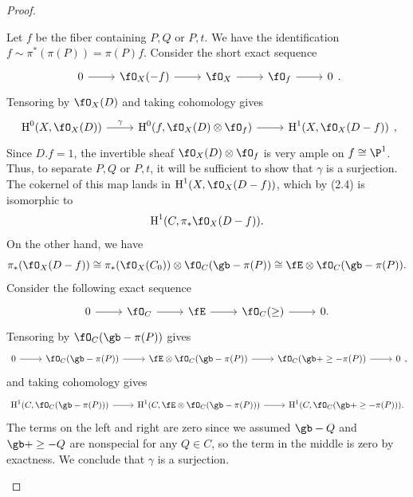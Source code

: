 \documentclass[a4paper]{article}
\begin{document}
\begin{enumerate} [label=\textbf{\arabic*.}, leftmargin=0em]
\begin{proof}
\begin{itemize} [leftmargin=0cm]
                        Let $f$ be the fiber containing $P, Q$ or $P, t$.
                        We have the identification $f \sim \pi^*(\pi(P)) = \pi(P) f$.
                        Consider the short exact sequence
                        \[\begin{tikzcd}
                                0 \arrow[r] & \fO_X(-f) \arrow[r] & \fO_X \arrow[r] & \fO_{f} \arrow[r] & 0
                            \end{tikzcd}. \]
                        Tensoring by $\fO_X(D)$ and taking cohomology gives
                        \[\begin{tikzcd}
                                \cH^0(X, \fO_X(D)) \arrow[r, "\gamma"] & \cH^0(f, \fO_X(D) \otimes \fO_{f}) \arrow[r] & \cH^1(X, \fO_X(D - f))
                            \end{tikzcd}, \]
                        Since $D.f = 1$, the invertible sheaf $\fO_X(D) \otimes \fO_f$ is very ample on $f \cong \P^1$.
                        Thus, to separate $P, Q$ or $P, t$, it will be sufficient to show that $\gamma$ is a surjection.
                        The cokernel of this map lands in $\cH^1(X, \fO_X(D - f))$, which by (2.4) is isomorphic to $$\cH^1(C, \pi_* \fO_X(D - f)).$$
                        On the other hand, we have
                        \begin{equation*}
                            \pi_*(\fO_X(D - f)) \cong \pi_*(\fO_X(C_0)) \otimes \fO_C(\gb - \pi(P)) \cong \fE \otimes \fO_C(\gb - \pi(P)).
                        \end{equation*}
                        Consider the following exact sequence
                        \[ \begin{tikzcd}
                                0 \arrow[r] & \fO_C \arrow[r] & \fE \arrow[r] & \fO_C(\ge) \arrow[r] & 0.
                            \end{tikzcd} \]
                        Tensoring by $\fO_C(\gb - \pi(P))$ gives
                        \[ \begin{tikzcd}
                                0 \arrow[r] & \fO_C(\gb - \pi(P)) \arrow[r] & \fE \otimes \fO_C(\gb - \pi(P)) \arrow[r] & \fO_C(\gb + \ge - \pi(P)) \arrow[r] & 0
                            \end{tikzcd} , \]
                        and taking cohomology gives
                        \[ \begin{tikzcd}
                                \cH^1(C, \fO_C(\gb - \pi(P))) \arrow[r] & \cH^1(C, \fE \otimes \fO_C(\gb - \pi(P))) \arrow[r] & \cH^1(C, \fO_C(\gb + \ge - \pi(P))).
                            \end{tikzcd} \]
                        The terms on the left and right are zero since we assumed $\gb - Q$ and $\gb + \ge - Q$ are nonspecial for any $Q \in C$, so the term in the middle is zero by exactness.
                        We conclude that $\gamma$ is a surjection.


\end{itemize}
\end{proof}
\end{enumerate}
\end{document}

